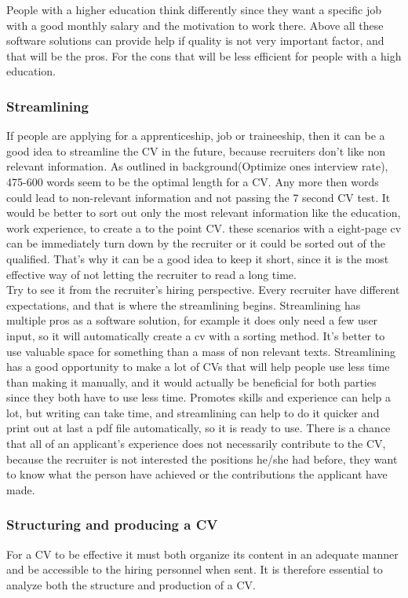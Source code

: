 People with a higher education think differently since they want a specific job
with a good monthly salary and the motivation to work there. 
Above all these software solutions can provide help if quality is not very important factor,
and that will be the pros. For the cons that will be less efficient for people with a high education.

\subsubsection{Streamlining}
If people are applying for a apprenticeship, job or traineeship, 
then it can be a good idea to streamline the CV in the future, because recruiters don't like non relevant information.
As outlined in background(Optimize ones interview rate), 475-600 words seem to be the optimal length for a CV.
Any more then words could lead to non-relevant information and not passing the 7 second CV test.
It would be better to sort out only the most relevant information 
like the education, work experience, to create a to the point CV. 
these scenarios with a eight-page cv can be immediately turn down by the recruiter or 
it could be sorted out of the qualified.
That's why it can be a good idea to keep it short, 
since it is the most effective way of not letting the recruiter to read a long time. \\

Try to see it from the recruiter's hiring perspective. Every recruiter have different expectations, 
and that is where the streamlining begins. Streamlining has multiple pros as a software solution,
for example it does only need a few user input, so it will automatically create a cv with a sorting method. 
It's better to use valuable space for something than a mass of non relevant texts.
Streamlining has a good opportunity to make a lot of CVs that will help people use less time than making it manually,
and it would actually be beneficial for both parties since they both have to use less time.
Promotes skills and experience can help a lot, but writing can take time, and streamlining can help to do it quicker 
and print out at last a pdf file automatically, so it is ready to use.
There is a chance that all of an applicant's experience does not necessarily contribute to the CV, 
because the recruiter is not interested the positions he/she had before, they want to know what the person have achieved
or the contributions the applicant have made. 

\subsubsection{Structuring and producing a CV}
For a CV to be effective it must both organize its content in an adequate manner and be accessible to the hiring personnel when sent.
It is therefore essential to analyze both the structure and production of a CV. \\

